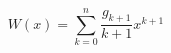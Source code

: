 \begin{equation}
W(x) = \sum \limits_{k=0}^{n} \frac{g_{k+1}}{k+1} x^{k+1}
\label{Wcoefs}
\end{equation} 
